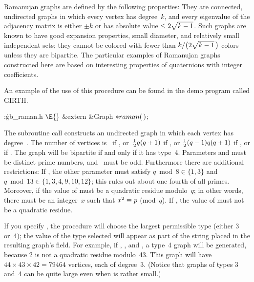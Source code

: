 Ramanujan graphs are defined by the following properties:
They are connected, undirected graphs in which every vertex has
degree~$k$, and every eigenvalue of the adjacency matrix
is either $\pm k$ or has absolute value $\le2\sqrt{\mathstrut k-1}$.
Such graphs are known to have good expansion properties, small diameter,
and relatively small independent sets; they cannot be colored with
fewer than $k/\bigl(2\sqrt{\mathstrut k-1}\,\bigr)$ colors unless they are
bipartite. The particular examples of Ramanujan graphs constructed here
are based on interesting properties of quaternions with integer coefficients.

An example of the use of this procedure can be found in the demo program
called {\sc GIRTH}.

\Y\B\4:\.{gb\_raman.h }\X${}\E{}$\6
\&{extern} \&{Graph} ${}{*}\\{raman}(\,){}$;\par
\fi

The subroutine call 
constructs an undirected graph in which each vertex has degree~.
The number of vertices is~ if , or~${1%
\over2}q(q+1)$ if ,
or ${1\over2}(q-1)q(q+1)$ if , or  if
. The graph will be bipartite if and only if it has
type~4.
Parameters  and  must be distinct prime numbers,
and ~must be odd. Furthermore there are additional restrictions:
If , the other parameter  must satisfy $q\bmod8\in%
\{1,3\}$
and $q\bmod13\in\{1,3,4,9,10,12\}$; this rules out about one fourth of
all primes. Moreover, if  the value of  must be a
quadratic residue modulo~$q$; in other words, there must be an
integer~$x$ such that $x^2\=p$ (mod~$q$). If , the value
of 
must not be a quadratic residue.

If you specify , the procedure
will choose the largest permissible type (either 3 or~4);
the value of the type selected will
appear as part of the string placed in the resulting graph's  field.
For example, if , , and , a type~4 graph will be
generated, because 2 is not a quadratic residue modulo~43. This
graph will have $44\times43\times42=79464$ vertices, each of degree~3.
(Notice that graphs of types 3 and~4 can be quite large even when
 is rather small.)

